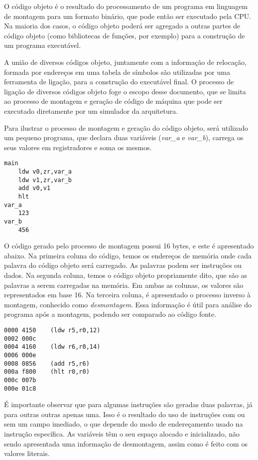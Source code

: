 \documentclass[11pt,a4paper]{report}
\begin{document}
O código objeto é o resultado do processamento de um programa em
linguagem de montagem para um formato binário, que pode então ser
executado pela CPU. Na maioria dos casos, o código objeto poderá ser
agregado a outras partes de código objeto (como bibliotecas de funções,
por exemplo) para a construção de um programa executável. 

A união de diversos códigos objeto, juntamente com a informação de relocação,
formada por endereços em uma tabela de símbolos são utilizadas por uma
ferramenta de ligação, para a construção do executável final. O processo
de ligação de diversos códigos objeto foge o escopo desse documento, que
se limita ao processo de montagem e geração de código de máquina que pode
ser executado diretamente por um simulador da arquitetura.

Para ilustrar o processo de montagem e geração do código objeto, será
utilizado um pequeno programa, que declara duas variáveis (\textit{var\_a}
e \textit{var\_b}), carrega os seus valores em registradores e soma os
mesmos.

\begin{verbatim}
main
    ldw v0,zr,var_a
    ldw v1,zr,var_b
    add v0,v1
    hlt
var_a
    123
var_b
    456
\end{verbatim}

O código gerado pelo processo de montagem possui 16 bytes, e este é
apresentado abaixo. Na primeira coluna do código, temos os endereços de
memória onde cada palavra do código objeto será carregado. As palavras
podem ser instruções ou dados. Na segunda coluna, temos o código objeto
propriamente dito, que são as palavras a serem carregadas na memória. Em
ambas as colunas, os valores são representados em base 16. Na terceira
coluna, é apresentado o processo inverso à montagem, conhecido como
\textit{desmontagem}. Essa informação é útil para análise do programa
após a montagem, podendo ser comparado ao código fonte.

\begin{verbatim}
0000 4150    (ldw r5,r0,12)
0002 000c
0004 4160    (ldw r6,r0,14)
0006 000e
0008 0856    (add r5,r6)
000a f800    (hlt r0,r0)
000c 007b
000e 01c8
\end{verbatim}

É importante observar que para algumas instruções são geradas duas
palavras, já para outras outras apenas uma. Isso é o resultado do uso de 
instruções com ou sem um campo imediado, o que depende
do modo de endereçamento usado na instrução específica. As variáveis
têm o seu espaço alocado e inicializado, não sendo apresentada uma
informação de desmontagem, assim como é feito com os valores literais.
\end{document}
